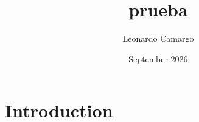 \documentclass{article}
\title{prueba}
\author{Leonardo Camargo}
\date{September 2026}
\begin{document}
\maketitle

\section{Introduction}
\end{document}
